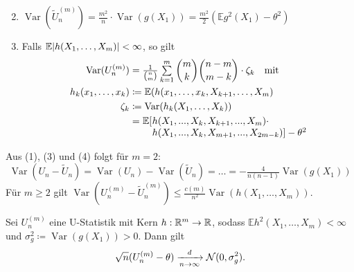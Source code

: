 \documentclass{cheat-sheet}
\newcommand{\E}{\mathbb{E}} %
\DeclareMathOperator{\var}{Var} %
\newcommand{\Normal}{\mathcal{N}} %
\begin{document}
\begin{lem}
  \begin{enumerate}[label=(\arabic*), itemindent=6pt]
    \setcounter{enumi}{1}
    \item $\var(\tilde{U}^{(m)}_n) = \tfrac{m^2}{n} \cdot \var(g(X_1)) = \tfrac{m^2}{2} ( \E g^2(X_1) - \theta^2 )$
    \item Falls $\E \abs{h(X_1, \ldots, X_m)} < \infty$, so gilt
    \begin{align*}
      \var(U_n^{(m)}) & = \tfrac{1}{\binom{n}{m}} \sum_{k=1}^m \binom{m}{k} \binom{n - m}{m - k} \cdot \zeta_k \quad \text{mit} \\
      h_k(x_1, \ldots, x_k) & \coloneqq \E(h(x_1, \ldots, x_k, X_{k+1}, \ldots, X_m) \\
      \zeta_k & \coloneqq \var(h_k(X_1, \ldots, X_k)) \\
      & =
      \arraycolsep=0.2pt
      \begin{array}[t]{l l}
        \E[ & h(X_1, \nldots, X_k, X_{k+1}, \nldots, X_m) \cdot \\
        & h(X_1, \nldots, X_k, X_{m+1}, \nldots, X_{2m-k})] - \theta^2
      \end{array}
    \end{align*}
  \end{enumerate}
\end{lem}

\begin{kor}
  Aus (1), (3) und (4) folgt für $m=2$:
  \[
    \var(U_n - \tilde{U}_n)
    = \var(U_n) - \var(\tilde{U}_n)
    = \ldots
    = - \tfrac{4}{n (n-1)} \var(g(X_1))
  \]
  Für $m \geq 2$ gilt $\var(U_n^{(m)} - \tilde{U}_n^{(m)}) \leq \tfrac{c(m)}{n^2} \var(h(X_1, \ldots, X_m))$.
\end{kor}



\begin{satz}
  Sei $U_n^{(m)}$ eine U-Statistik mit Kern $h : \mathbb{R}^m \to \mathbb{R}$, sodass $\E h^2(X_1, \ldots, X_m) < \infty$ und $\sigma_g^2 \coloneqq \var(g(X_1)) > 0$.
  Dann gilt
  \[ \sqrt{n} (U_n^{(m)} - \theta) \xra[n \to \infty]{d} \Normal(0, \sigma_g^2). \]
\end{satz}
\end{document}

